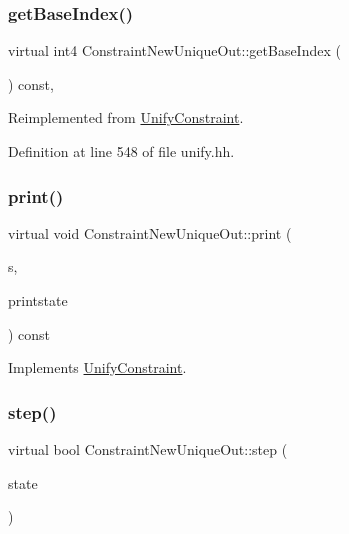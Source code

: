 \subsubsection{\texorpdfstring{getBaseIndex()}{getBaseIndex()}}
{\footnotesize\ttfamily virtual int4 Constraint\+New\+Unique\+Out\+::get\+Base\+Index (\begin{DoxyParamCaption}\item[{void}]{ }\end{DoxyParamCaption}) const\hspace{0.3cm}{\ttfamily [inline]}, {\ttfamily [virtual]}}



Reimplemented from \mbox{\hyperlink{class_unify_constraint_a44f0164f38ac1fdc44fc73ebe7678de1}{Unify\+Constraint}}.



Definition at line 548 of file unify.\+hh.

\mbox{\label{class_constraint_new_unique_out_a256e1cdd4cfb6d3bcc2bba2699d9d44c}} 
\subsubsection{\texorpdfstring{print()}{print()}}
{\footnotesize\ttfamily virtual void Constraint\+New\+Unique\+Out\+::print (\begin{DoxyParamCaption}\item[{ostream \&}]{s,  }\item[{\mbox{\hyperlink{class_unify_c_printer}{Unify\+C\+Printer}} \&}]{printstate }\end{DoxyParamCaption}) const\hspace{0.3cm}{\ttfamily [virtual]}}



Implements \mbox{\hyperlink{class_unify_constraint_a774f6a611a96384766cb8e8d8f5ff41f}{Unify\+Constraint}}.

\mbox{\label{class_constraint_new_unique_out_a164256b52634fe6d5a858a601845dfe5}} 
\subsubsection{\texorpdfstring{step()}{step()}}
{\footnotesize\ttfamily virtual bool Constraint\+New\+Unique\+Out\+::step (\begin{DoxyParamCaption}\item[{\mbox{\hyperlink{class_unify_state}{Unify\+State}} \&}]{state }\end{DoxyParamCaption})\hspace{0.3cm}{\ttfamily [virtual]}}



